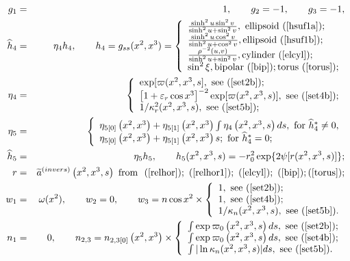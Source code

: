 \documentclass[a4paper,preprint,prabib,aps]{revtex4}
\begin{document}
\begin{eqnarray}
g_{1} &=&1,\qquad g_{2}=-1,\qquad g_{3}=-1,  \label{ellipschi1} \\
\widehat{h}_{4} &=&\eta _{4}h_{4},\qquad h_{4}=g_{ss}(x^{2},x^{3})=\left\{
\begin{array}{l}
\frac{\sinh ^{2}u\sin ^{2}v}{\sinh ^{2}u+\sin ^{2}v},%
\mbox{ ellipsoid
(\ref{hsuf1a})}; \\
\frac{\sinh ^{2}u\cos ^{2}v}{\sinh ^{2}u+\cos ^{2}v},%
\mbox{ellipsoid
(\ref{hsuf1b})}; \\
\frac{\rho ^{-2}(u,v)}{\sinh ^{2}u+\sin ^{2}v},\mbox{cylinder (\ref{elcyl})};
\\
\sin ^{2}\xi ,\mbox{bipolar  (\ref{bip})};\mbox{torus  (\ref{torus})};
\end{array}
\right.   \nonumber \\
\eta _{4} &=&\left\{
\begin{array}{l}
\exp [\varpi (x^{2},x^{3},s],\mbox{ see  (\ref{set2b})}; \\
\left[ 1+\varepsilon _{r}\cos x^{3}\right] ^{-2}\exp [\varpi
(x^{2},x^{3},s)],\mbox{
see  (\ref{set4b})}; \\
1/\kappa _{r}^{2}(x^{2},x^{3},s),\mbox{ see  (\ref{set5b})};
\end{array}
\right.  \\
\eta _{5} &=&\left\{
\begin{array}{l}
\eta _{5[0]}\left( x^{2},x^{3}\right) +\eta _{5[1]}\left( x^{2},x^{3}\right)
\int \eta _{4}\left( x^{2},x^{3},s\right) ds,\mbox{ for }\widehat{h}%
_{4}^{\ast }\neq 0, \\
\eta _{5[0]}\left( x^{2},x^{3}\right) +\eta _{5[1]}\left( x^{2},x^{3}\right)
s;\mbox{ for }\widehat{h}_{4}^{\ast }=0;
\end{array}
\right.   \nonumber \\
\widehat{h}_{5} &=&\eta _{5}h_{5},\qquad h_{5}(x^{2},x^{3},s)=-r_{0}^{2}\exp
\{2\psi \lbrack r(x^{2},x^{3},s)]\};  \nonumber \\
r &=&\widetilde{a}^{(invers)}\left( x^{2},x^{3},s\right) \mbox{ from }%
\mbox{
(\ref{relhor})};\mbox{ (\ref{relhor1})};\mbox{ (\ref{elcyl})};%
\mbox{
(\ref{bip})};\mbox{(\ref{torus})};  \nonumber \\
w_{1} &=&\omega (x^{2}),\qquad w_{2}=0,\qquad w_{3}=n\cos x^{2}\times
\left\{
\begin{array}{l}
1,\mbox{ see  (\ref{set2b})}; \\
1,\mbox{ see  (\ref{set4b})}; \\
1/\kappa _{n}(x^{2},x^{3},s),\mbox{ see  (\ref{set5b})}.
\end{array}
\right.   \nonumber \\
\ n_{1} &=&0,\qquad n_{2,3}=n_{2,3[0]}\left( x^{2},x^{3}\right) \times
\left\{
\begin{array}{l}
\int \exp \varpi _{0}\left( x^{2},x^{3},s\right) ds,\mbox{ see
(\ref{set2b})}; \\
\int \exp \varpi _{0}\left( x^{2},x^{3},s\right) ds,\mbox{ see
(\ref{set4b})}; \\
\int |\ln \kappa _{n}(x^{2},x^{3},s)|ds,\mbox{ see  (\ref{set5b})}.
\end{array}
\right. ^{{}}  \nonumber
\end{eqnarray}
\end{document}
